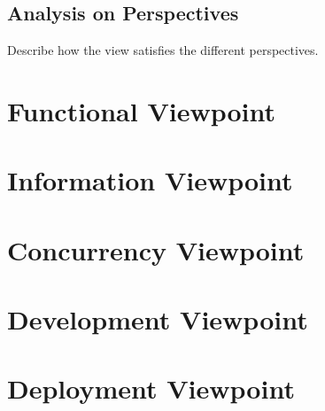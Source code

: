 \documentclass{article}
\begin{document}
\subsection*{Analysis on Perspectives}
Describe how the view satisfies the different perspectives.

\section*{Functional Viewpoint}

\section*{Information Viewpoint}

\section*{Concurrency Viewpoint}

\section*{Development Viewpoint}

\section*{Deployment Viewpoint}
\end{document}
